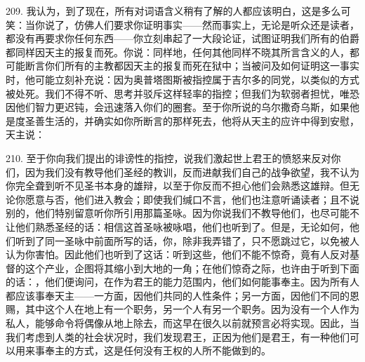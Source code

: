 209. 我认为，到了现在，所有对词语含义稍有了解的人都应该明白，这是多么可笑：当你说了，仿佛人们要求你证明事实——然而事实上，无论是听众还是读者，都没有再要求你任何东西——你立刻串起了一大段论证，试图证明我们所有的伯爵都同样因天主的报复而死。你说：同样地，任何其他同样不晓其所言含义的人，都可能断言你们所有的主教都因天主的报复而死在狱中；当被问及如何证明这一事实时，他可能立刻补充说：因为奥普塔图斯被指控属于吉尔多的同党，以类似的方式被处死。我们不得不听、思考并驳斥这样轻率的指控；但我们为软弱者担忧，唯恐因他们智力更迟钝，会迅速落入你们的圈套。至于你所说的乌尔撒奇乌斯，如果他是度圣善生活的，并确实如你所断言的那样死去，他将从天主的应许中得到安慰，天主说：\par

210. 至于你向我们提出的诽谤性的指控，说我们激起世上君王的愤怒来反对你们，因为我们没有教导他们圣经的教训，反而进献我们自己的战争欲望，我不认为你完全聋到听不见圣书本身的雄辩，以至于你反而不担心他们会熟悉这雄辩。但无论你愿意与否，他们进入教会；即使我们缄口不言，他们也注意听诵读者；且不说别的，他们特别留意听你所引用那篇圣咏。因为你说我们不教导他们，也尽可能不让他们熟悉圣经的话：相信这首圣咏被咏唱，他们也听到了。但是，无论如何，他们听到了同一圣咏中前面所写的话，你，除非我弄错了，只不愿跳过它，以免被人认为你害怕。因此他们也听到了这话：听到这些，他们不能不惊奇，竟有人反对基督的这个产业，企图将其缩小到大地的一角；在他们惊奇之际，也许由于听到下面的话：，他们便询问，在作为君王的能力范围内，他们如何能事奉主。因为所有人都应该事奉天主——一方面，因他们共同的人性条件；另一方面，因他们不同的恩赐，其中这个人在地上有一个职务，另一个人有另一个职务。因为没有一个人作为私人，能够命令将偶像从地上除去，而这早在很久以前就预言必将实现。因此，当我们考虑到人类的社会状况时，我们发现君王，正因为他们是君王，有一种他们可以用来事奉主的方式，这是任何没有王权的人所不能做到的。\par

